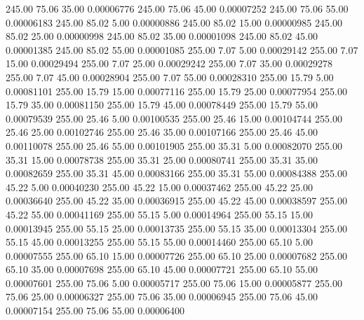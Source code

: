     245.00     75.06     35.00     0.00006776
    245.00     75.06     45.00     0.00007252
    245.00     75.06     55.00     0.00006183
    245.00     85.02      5.00     0.00000886
    245.00     85.02     15.00     0.00000985
    245.00     85.02     25.00     0.00000998
    245.00     85.02     35.00     0.00001098
    245.00     85.02     45.00     0.00001385
    245.00     85.02     55.00     0.00001085
    255.00      7.07      5.00     0.00029142
    255.00      7.07     15.00     0.00029494
    255.00      7.07     25.00     0.00029242
    255.00      7.07     35.00     0.00029278
    255.00      7.07     45.00     0.00028904
    255.00      7.07     55.00     0.00028310
    255.00     15.79      5.00     0.00081101
    255.00     15.79     15.00     0.00077116
    255.00     15.79     25.00     0.00077954
    255.00     15.79     35.00     0.00081150
    255.00     15.79     45.00     0.00078449
    255.00     15.79     55.00     0.00079539
    255.00     25.46      5.00     0.00100535
    255.00     25.46     15.00     0.00104744
    255.00     25.46     25.00     0.00102746
    255.00     25.46     35.00     0.00107166
    255.00     25.46     45.00     0.00110078
    255.00     25.46     55.00     0.00101905
    255.00     35.31      5.00     0.00082070
    255.00     35.31     15.00     0.00078738
    255.00     35.31     25.00     0.00080741
    255.00     35.31     35.00     0.00082659
    255.00     35.31     45.00     0.00083166
    255.00     35.31     55.00     0.00084388
    255.00     45.22      5.00     0.00040230
    255.00     45.22     15.00     0.00037462
    255.00     45.22     25.00     0.00036640
    255.00     45.22     35.00     0.00036915
    255.00     45.22     45.00     0.00038597
    255.00     45.22     55.00     0.00041169
    255.00     55.15      5.00     0.00014964
    255.00     55.15     15.00     0.00013945
    255.00     55.15     25.00     0.00013735
    255.00     55.15     35.00     0.00013304
    255.00     55.15     45.00     0.00013255
    255.00     55.15     55.00     0.00014460
    255.00     65.10      5.00     0.00007555
    255.00     65.10     15.00     0.00007726
    255.00     65.10     25.00     0.00007682
    255.00     65.10     35.00     0.00007698
    255.00     65.10     45.00     0.00007721
    255.00     65.10     55.00     0.00007601
    255.00     75.06      5.00     0.00005717
    255.00     75.06     15.00     0.00005877
    255.00     75.06     25.00     0.00006327
    255.00     75.06     35.00     0.00006945
    255.00     75.06     45.00     0.00007154
    255.00     75.06     55.00     0.00006400
